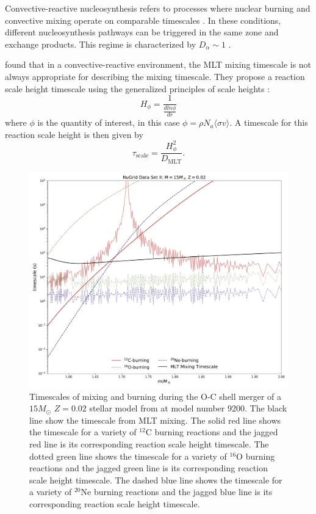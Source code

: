 Convective-reactive nucleosynthesis refers to processes where nuclear burning and convective mixing operate on comparable timescales \citep{herwigCONVECTIVEREACTIVEPROTON2011,ritterNuGridStellarData2018}.
In these conditions, different nucleosynthesis pathways can be triggered in the same zone and exchange products.
This regime is characterized by $D_\alpha\sim 1$ \citep{herwigCONVECTIVEREACTIVEPROTON2011}.

\cite{herwigCONVECTIVEREACTIVEPROTON2011} found that in a convective-reactive environment, the MLT mixing timescale is not always appropriate for describing the mixing timescale.
They propose a reaction scale height timescale using the generalized principles of scale heights \citep{chapmanScaleTimesScale1961}:
\begin{equation}
    H_\phi = \frac{1}{\frac{d ln \phi}{d r}}
\end{equation}
where $\phi$ is the quantity of interest, in this case $\phi = \rho N_a \langle \sigma v \rangle$.
A timescale for this reaction scale height is then given by
\begin{equation}
    \tau_{\mathrm{scale}} = \frac{H_\phi^2}{D_{\mathrm{MLT}}}.
\end{equation}

\begin{figure}
\centering
\includegraphics[width=\textwidth]{chapters/1/figures/timescales.pdf}
\caption{Timescales of mixing and burning during the O-C shell merger of a $15 M_\odot$ $Z=0.02$ stellar model from \cite{ritterNuGridStellarData2018} at model number 9200. The black line show the timescale from MLT mixing. The solid red line shows the timescale for a variety of $^{12}\mathrm{C}$ burning reactions and the jagged red line is its corresponding reaction scale height timescale. The dotted green line shows the timescale for a variety of $^{16}\mathrm{O}$ burning reactions and the jagged green line is its corresponding reaction scale height timescale. The dashed blue line shows the timescale for a variety of $^{20}\mathrm{Ne}$ burning reactions and the jagged blue line is its corresponding reaction scale height timescale.}
\label{fig:ritter_timescales}
\end{figure}

